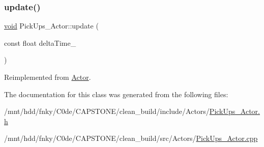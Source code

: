 \subsubsection{\texorpdfstring{update()}{update()}}
{\footnotesize\ttfamily \hyperlink{imgui__impl__opengl3__loader_8h_ac668e7cffd9e2e9cfee428b9b2f34fa7}{void} Pick\+Ups\+\_\+\+Actor\+::update (\begin{DoxyParamCaption}\item[{const float}]{delta\+Time\+\_\+ }\end{DoxyParamCaption})\hspace{0.3cm}{\ttfamily [virtual]}}



Reimplemented from \hyperlink{classActor_a724ff8f2e9c34f15a6c443a3912504c4}{Actor}.



The documentation for this class was generated from the following files\+:\begin{DoxyCompactItemize}
\item 
/mnt/hdd/fnky/\+C0de/\+C\+A\+P\+S\+T\+O\+N\+E/clean\+\_\+build/include/\+Actors/\hyperlink{PickUps__Actor_8h}{Pick\+Ups\+\_\+\+Actor.\+h}\item 
/mnt/hdd/fnky/\+C0de/\+C\+A\+P\+S\+T\+O\+N\+E/clean\+\_\+build/src/\+Actors/\hyperlink{PickUps__Actor_8cpp}{Pick\+Ups\+\_\+\+Actor.\+cpp}\end{DoxyCompactItemize}
